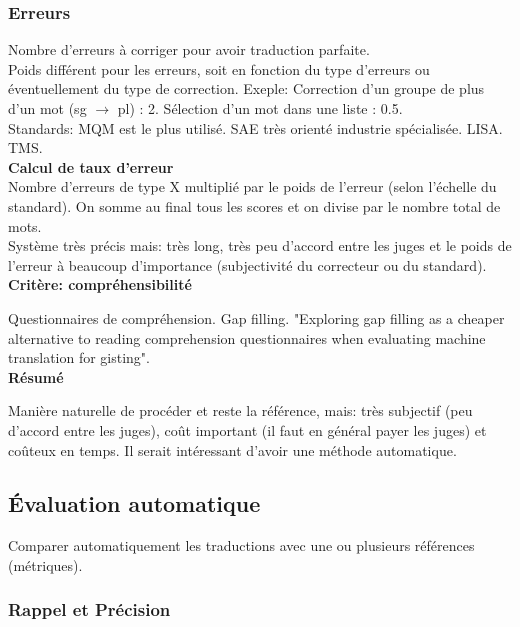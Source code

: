 \subsubsection{Erreurs}

Nombre d'erreurs à corriger pour avoir traduction parfaite.\\

Poids différent pour les erreurs, soit en fonction du type d'erreurs ou éventuellement du type de correction.
Exeple: Correction d'un groupe de plus d'un mot (sg $\rightarrow$ pl) : 2. Sélection d'un mot dans une liste : 0.5. \\

Standards: MQM est le plus utilisé. SAE très orienté industrie spécialisée. LISA. TMS. \\

\textbf{Calcul de taux d'erreur} \\

Nombre d'erreurs de type X multiplié par le poids de l'erreur (selon l'échelle du standard). On somme au final tous les scores et on divise par le nombre total de mots. \\

Système très précis mais: très long, très peu d'accord entre les juges et le poids de l'erreur à beaucoup d'importance (subjectivité du correcteur ou du standard).\\


\textbf{Critère: compréhensibilité}

Questionnaires de compréhension. Gap filling. "Exploring gap filling as a cheaper alternative to reading comprehension questionnaires when evaluating machine translation for gisting".\\

\textbf{Résumé}

Manière naturelle de procéder et reste la référence, mais: très subjectif (peu d'accord entre les juges), coût important (il faut en général payer les juges) et coûteux en temps. Il serait intéressant d'avoir une méthode automatique.

\subsection{Évaluation automatique}

Comparer automatiquement les traductions avec une ou plusieurs références (métriques).

\subsubsection{Rappel et Précision}

